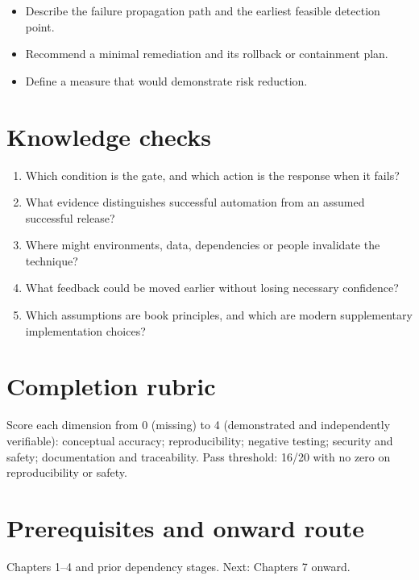\documentclass[10pt,letterpaper]{article}
\begin{document}
\begin{itemize}
\item Describe the failure propagation path and the earliest feasible detection point.
\item Recommend a minimal remediation and its rollback or containment plan.
\item Define a measure that would demonstrate risk reduction.
\end{itemize}

\section{Knowledge checks}
\begin{enumerate}
\item Which condition is the gate, and which action is the response when it fails?
\item What evidence distinguishes successful automation from an assumed successful release?
\item Where might environments, data, dependencies or people invalidate the technique?
\item What feedback could be moved earlier without losing necessary confidence?
\item Which assumptions are book principles, and which are modern supplementary implementation choices?
\end{enumerate}

\section{Completion rubric}
Score each dimension from 0 (missing) to 4 (demonstrated and independently verifiable): conceptual accuracy; reproducibility; negative testing; security and safety; documentation and traceability. Pass threshold: 16/20 with no zero on reproducibility or safety.


\section{Prerequisites and onward route}
Chapters 1--4 and prior dependency stages. Next: Chapters 7 onward.
\end{document}

